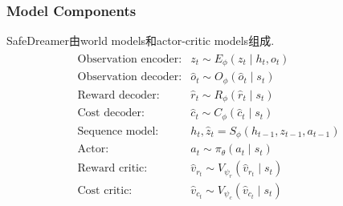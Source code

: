 \documentclass[10pt,mathserif]{beamer}%
\begin{document}
\begin{frame}[t, fragile]
	\frametitle{Model Components}
	\begin{spacing}{1.5}
		SafeDreamer由world models和actor-critic models组成.
		\begin{equation*}
			\begin{split}
			\begin{array}{ll}
			\text {Observation encoder:} & z_t \sim E_\phi\left(z_t \mid h_t, o_t\right) \\ 
			\text {Observation decoder:} & \hat{o}_t \sim O_\phi\left(\hat{o}_t \mid s_t\right) \\
			\text {Reward decoder:} & \hat{r}_t \sim R_\phi\left(\hat{r}_t \mid s_t\right)  \\ 
			\text {Cost decoder:} & \hat{c}_t \sim C_\phi\left(\hat{c}_t \mid s_t\right) \\
			\text {Sequence model:} & h_t, \hat{z}_t=S_\phi\left(h_{t-1}, z_{t-1}, a_{t-1}\right) \\
			\text{Actor:} & a_{t} \sim \pi_{\theta}( a_t\mid s_t)\\
			\text{Reward critic:} & \hat{v}_{r_t} \sim V_{\psi_r}(\hat{v}_{r_t} \mid s_t)\\
			\text{Cost critic:} & \hat{v}_{c_t} \sim V_{\psi_c}(\hat{v}_{c_t} \mid s_t)\\
			\end{array}
			\end{split}
		\label{eq:definition}
		\end{equation*}
		
	\end{spacing}
\end{frame}
\end{document}
